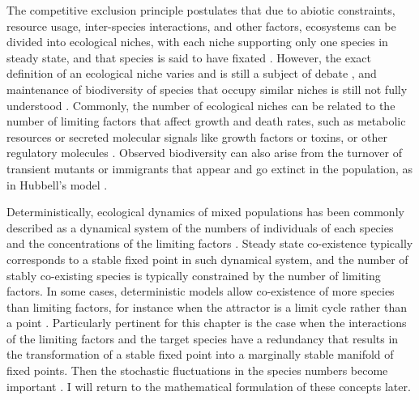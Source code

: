 The competitive exclusion principle postulates that due to abiotic constraints, resource usage, inter-species interactions, and other factors, ecosystems can be divided into ecological niches, with each niche supporting only one species in steady state, and that species is said to have fixated \cite{Hardin1960,Mayfield2010,Kimura1968,Nadell2013}. 
However, the exact definition of an ecological niche varies and is still a subject of debate \cite{Leibold1995,Hutchinson1961,Abrams1980,Chesson2000,Adler2010,Capitan2017,Fisher2014}, and maintenance of biodiversity of species that occupy similar niches is still not fully understood \cite{May1999,Pennisi2005,Posfai2017}. 
Commonly, the number of ecological niches can be related to the number of limiting factors that affect growth and death rates, such as metabolic resources or secreted molecular signals like growth factors or toxins, or other regulatory molecules \cite{Armstrong1976,McGehee1977a,Armstrong1980,Posfai2017}. 
Observed biodiversity can also arise from the turnover of transient mutants or immigrants that appear and go extinct in the population, as in Hubbell's model \cite{Hubbell2001,Desai2007,Carroll2015}.

Deterministically, ecological dynamics of mixed populations has been commonly described as a dynamical system of the numbers of individuals of each species and the concentrations of the limiting factors \cite{Armstrong1976,McGehee1977a,Armstrong1980}. 
Steady state co-existence typically corresponds to a stable fixed point in such dynamical system, and the number of stably co-existing species is typically constrained by the number of limiting factors. 
In some cases, deterministic models allow co-existence of more species than limiting factors, for instance when the attractor is a limit cycle rather than a point \cite{Smale1976,Armstrong1980}. 
Particularly pertinent for this chapter is the case when the interactions of the limiting factors and the target species have a redundancy that results in the transformation of a stable fixed point into a marginally stable manifold of fixed points. 
Then the stochastic fluctuations in the species numbers become important \cite{Volterra1926,Armstrong1980,Bomze1983,Chesson1990,Antal2006,Posfai2017}. 
I will return to the mathematical formulation of these concepts later. %


